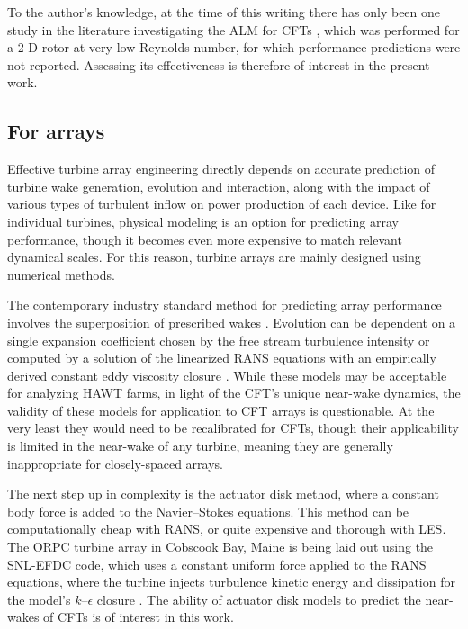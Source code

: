 To the author's knowledge, at the time of
this writing there has only been one study in the literature investigating the
ALM for CFTs \cite{Shamsoddin2014}, which was performed for a 2-D rotor at very
low Reynolds number, for which performance predictions were not reported.
Assessing its effectiveness is therefore of interest in the present work.


\subsection{For arrays}

Effective turbine array engineering directly depends on accurate prediction of
turbine wake generation, evolution and interaction, along with the impact of
various types of turbulent inflow on power production of each device. Like for
individual turbines, physical modeling is an option for predicting array
performance, though it becomes even more expensive to match relevant dynamical
scales. For this reason, turbine arrays are mainly designed using numerical
methods.

The contemporary industry standard method for predicting array performance
involves the superposition of prescribed wakes \cite{Stevens2014b}. Evolution
can be dependent on a single expansion coefficient chosen by the free stream
turbulence intensity \cite{Jensen1983, Choi2013} or computed by a solution of
the linearized RANS equations with an empirically derived constant eddy
viscosity closure \cite{Ainslie1988}. While these models may be acceptable for
analyzing HAWT farms, in light of the CFT's unique near-wake dynamics, the
validity of these models for application to CFT arrays is questionable. At the
very least they would need to be recalibrated for CFTs, though their
applicability is limited in the near-wake of any turbine, meaning they are
generally inappropriate for closely-spaced arrays.
	
The next step up in complexity is the actuator disk method, where a constant
body force is added to the Navier--Stokes equations. This method can be
computationally cheap with RANS, or quite expensive and thorough with LES. The
ORPC turbine array in Cobscook Bay, Maine is being laid out using the SNL-EFDC
code, which uses a constant uniform force applied to the RANS equations, where
the turbine injects turbulence kinetic energy and dissipation for the model's
$k$--$\epsilon$ closure \cite{Nelson2013}. The ability of actuator disk models
to predict the near-wakes of CFTs is of interest in this work.
	
